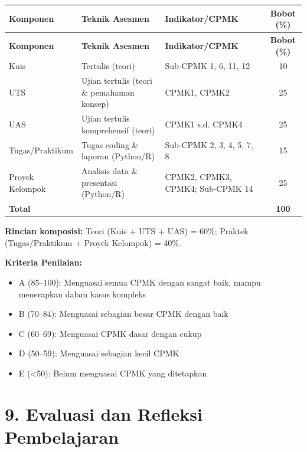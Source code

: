 \documentclass[12pt,a4paper]{article}
\begin{document}
\begin{longtable}{|>{\raggedright\arraybackslash}p{2.5cm}|>{\raggedright\arraybackslash}p{4cm}|>{\raggedright\arraybackslash}p{5.5cm}|c|}
\hline
\textbf{Komponen} & \textbf{Teknik Asesmen} & \textbf{Indikator/CPMK} & \textbf{Bobot (\%)} \\
\hline
\endfirsthead
\hline
\textbf{Komponen} & \textbf{Teknik Asesmen} & \textbf{Indikator/CPMK} & \textbf{Bobot (\%)} \\
\hline
\endhead
\hline
\endfoot

Kuis & Tertulis (teori) & Sub-CPMK 1, 6, 11, 12 & 10 \\
\hline
UTS & Ujian tertulis (teori \& pemahaman konsep) & CPMK1, CPMK2 & 25 \\
\hline
UAS & Ujian tertulis komprehensif (teori) & CPMK1 s.d. CPMK4 & 25 \\
\hline
Tugas/Praktikum & Tugas coding \& laporan (Python/R) & Sub-CPMK 2, 3, 4, 5, 7, 8 & 15 \\
\hline
Proyek Kelompok & Analisis data \& presentasi (Python/R) & CPMK2, CPMK3, CPMK4; Sub-CPMK 14 & 25 \\
\hline
\textbf{Total} & & & \textbf{100} \\
\hline
\end{longtable}

\textbf{Rincian komposisi:} Teori (Kuis + UTS + UAS) = 60\%; Praktek (Tugas/Praktikum + Proyek Kelompok) = 40\%.

\textbf{Kriteria Penilaian:}
\begin{itemize}[leftmargin=*]
  \item A (85--100): Menguasai semua CPMK dengan sangat baik, mampu menerapkan dalam kasus kompleks
  \item B (70--84): Menguasai sebagian besar CPMK dengan baik
  \item C (60--69): Menguasai CPMK dasar dengan cukup
  \item D (50--59): Menguasai sebagian kecil CPMK
  \item E (<50): Belum menguasai CPMK yang ditetapkan
\end{itemize}

\vspace{0.5cm}

\section*{9. Evaluasi dan Refleksi Pembelajaran}
\end{document}
